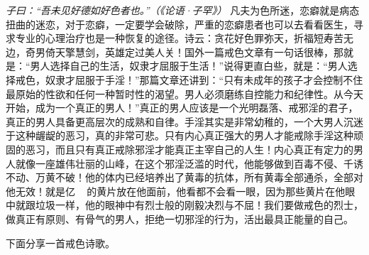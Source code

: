 \textit{子曰：“吾未见好德如好色者也。”（《论语·子罕》）} 凡夫为色所迷，恋癖就是病态扭曲的迷恋，对于恋癖，一定要学会破除，严重的恋癖患者也可以去看看医生，寻求专业的心理治疗也是一种恢复的途径。诗云：贪花好色罪弥天，折福短寿苦无边，奇男倚天擎慧剑，英雄定过美人关！国外一篇戒色文章有一句话很棒，那就是：“男人选择自己的生活，奴隶才屈服于生活！”说得更直白些，就是：“男人选择戒色，奴隶才屈服于手淫！”那篇文章还讲到：“只有未成年的孩子才会控制不住最原始的性欲和任何一种暂时性的渴望。男人必须磨练自控能力和纪律性。从今天开始，成为一个真正的男人！”真正的男人应该是一个光明磊落、戒邪淫的君子，真正的男人具备更高层次的成熟和自律。手淫其实是非常幼稚的，一个大男人沉迷于这种龌龊的恶习，真的非常可悲。只有内心真正强大的男人才能戒除手淫这种顽固的恶习，而且只有真正戒除邪淫才能真正主宰自己的人生！内心真正有定力的男人就像一座雄伟壮丽的山峰，在这个邪淫泛滥的时代，他能够做到百毒不侵、千诱不动、万黄不破！他的体内已经培养出了黄毒的抗体，所有黄毒全部通杀，全部对他无效！就是亿 \unit{\giga\byte} 的黄片放在他面前，他看都不会看一眼，因为那些黄片在他眼中就跟垃圾一样，他的眼神中有烈士般的刚毅决烈与不屈！我们要做戒色的烈士，做真正有原则、有骨气的男人，拒绝一切邪淫的行为，活出最具正能量的自己。

下面分享一首戒色诗歌。


